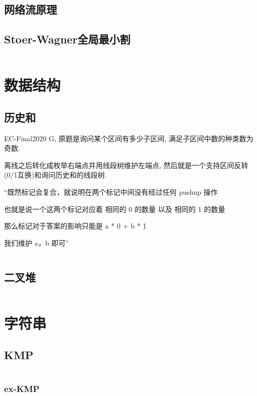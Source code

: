 \documentclass[a4paper]{article}
\begin{document}
\begin{multicols}{2}
			\subsection{网络流原理}
				
			
			\subsection{Stoer-Wagner全局最小割}
				\inputminted{cpp}{../src/graph/stoer-wagner.cpp}
			
		\section{数据结构}
			\subsection{历史和}

				EC-Final2020 G, 原题是询问某个区间有多少子区间, 满足子区间中数的种类数为奇数.

				离线之后转化成枚举右端点并用线段树维护左端点, 然后就是一个支持区间反转(0/1互换)和询问历史和的线段树.

				``既然标记会复合，就说明在两个标记中间没有经过任何 pushup 操作

				也就是说一个这两个标记对应着 相同的 0 的数量 以及 相同的 1 的数量

				那么标记对于答案的影响只能是 a * 0 + b * 1

				我们维护 a，b 即可''

				\inputminted{cpp}{../src/datastructure/ec20g.cpp}
			
			\subsection{二叉堆}
				\inputminted{cpp}{../src/datastructure/二叉堆.cpp}

		\section{字符串}
			\subsection{KMP}
				\inputminted{cpp}{../src/string/KMP.cpp}
				
				\subsubsection{ex-KMP}
					\inputminted{cpp}{../src/string/exKMP.cpp}

\end{multicols}
\end{document}
